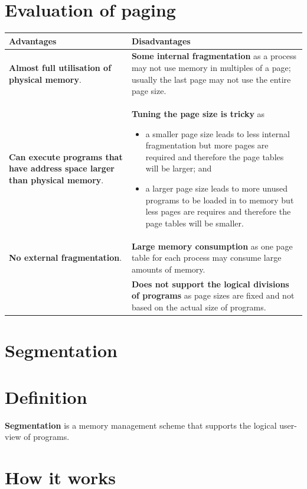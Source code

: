 \documentclass[a4paper]{systems-software}
\begin{document}
\section*{Evaluation of paging}

\begin{longtabu} to \textwidth {| X[1,l] | X[1,l] |}
    \hline
    \textbf{Advantages} & \textbf{Disadvantages}
	\\ \hline
	\textbf{Almost full utilisation of physical memory}. &
	\textbf{Some internal fragmentation} as a process may not use memory in multiples of a page; usually the last page may not use the entire page size.
	\\ \hline
	\textbf{Can execute programs that have address space larger than physical memory}. &
	\textbf{Tuning the page size is tricky} as
	\begin{itemize}
		\item a smaller page size leads to less internal fragmentation but more pages are required and therefore the page tables will be larger; and
		\item a larger page size leads to more unused programs to be loaded in to memory but less pages are requires and therefore the page tables will be smaller.
	\end{itemize}
	\\ \hline
	\textbf{No external fragmentation}. & 
	\textbf{Large memory consumption} as one page table for each process may consume large amounts of memory.
	\\ \hline
	& \textbf{Does not support the logical divisions of programs} as page sizes are fixed and not based on the actual size of programs.
	\\ \hline
\end{longtabu}


\section{Segmentation}

\section*{Definition}

\textbf{Segmentation} is a memory management scheme that supports the logical user-view of programs.


\section*{How it works}
\end{document}
